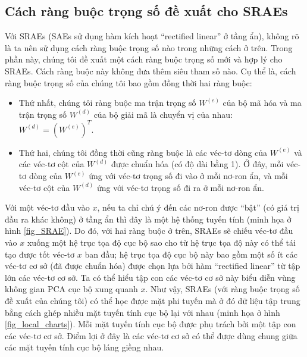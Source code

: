 \subsection{Cách ràng buộc trọng số đề xuất cho SRAEs}
Với SRAEs (SAEs sử dụng hàm kích hoạt ``rectified linear'' ở tầng ẩn), không rõ là ta nên sử dụng cách ràng buộc trọng số nào trong những cách ở trên. Trong phần này, chúng tôi đề xuất một cách ràng buộc trọng số mới và hợp lý cho SRAEs. Cách ràng buộc này không đưa thêm siêu tham số nào. Cụ thể là, cách ràng buộc trọng số của chúng tôi bao gồm đồng thời hai ràng buộc:
\begin{itemize}
	\item Thứ nhất, chúng tôi ràng buộc ma trận trọng số $W^{(e)}$ của bộ mã hóa và ma trận trọng số $W^{(d)}$ của bộ giải mã là chuyển vị của nhau: $W^{(d)} = (W^{(e)})^T$.
	\item Thứ hai, chúng tôi đồng thời cũng ràng buộc là các véc-tơ dòng của $W^{(e)}$ và các véc-tơ cột của $W^{(d)}$ được chuẩn hóa (có độ dài bằng 1). Ở đây, mỗi véc-tơ dòng của $W^{(e)}$ ứng với véc-tơ trọng số đi vào ở mỗi nơ-ron ẩn, và mỗi véc-tơ cột của $W^{(d)}$ ứng với véc-tơ trọng số đi ra ở mỗi nơ-ron ẩn.
\end{itemize}

Với một véc-tơ đầu vào $x$, nếu ta chỉ chú ý đến các nơ-ron được ``bật'' (có giá trị đầu ra khác không) ở tầng ẩn thì đây là một hệ thống tuyến tính (minh họa ở hình \ref{fig_SRAE}). Do đó, với hai ràng buộc ở trên, SRAEs sẽ chiếu véc-tơ đầu vào $x$ xuống một hệ trục tọa độ cục bộ sao cho từ hệ trục tọa độ này có thể tái tạo được tốt véc-tơ $x$ ban đầu; hệ trục tọa độ cục bộ này bao gồm một số ít các véc-tơ cơ sở (đã được chuẩn hóa) được chọn lựa bởi hàm ``rectified linear'' từ tập lớn các véc-tơ cơ sở. Ta có thể hiểu tập con các véc-tơ cơ sở này biểu diễn vùng không gian PCA cục bộ xung quanh $x$. Như vậy, SRAEs (với ràng buộc trọng số đề xuất của chúng tôi) có thể học được mặt phi tuyến mà ở đó dữ liệu tập trung bằng cách ghép nhiều mặt tuyến tính cục bộ lại với nhau (minh họa ở hình \ref{fig_local_charts}). Mỗi mặt tuyến tính cục bộ được phụ trách bởi một tập con các véc-tơ cơ sở. Điểm lợi ở đây là các véc-tơ cơ sở có thể được dùng chung giữa các mặt tuyến tính cục bộ láng giềng nhau.

